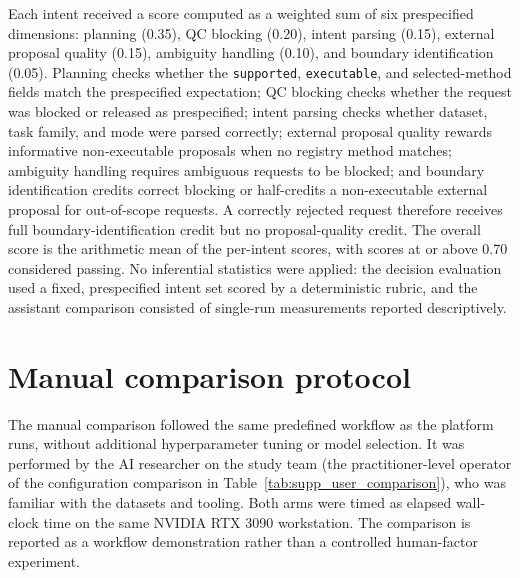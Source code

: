 \documentclass[final,5p,times,twocolumn]{elsarticle}
\begin{document}
Each intent received a score computed as a weighted sum of six prespecified dimensions: planning (0.35), QC blocking (0.20), intent parsing (0.15), external proposal quality (0.15), ambiguity handling (0.10), and boundary identification (0.05). Planning checks whether the \texttt{supported}, \texttt{executable}, and selected-method fields match the prespecified expectation; QC blocking checks whether the request was blocked or released as prespecified; intent parsing checks whether dataset, task family, and mode were parsed correctly; external proposal quality rewards informative non-executable proposals when no registry method matches; ambiguity handling requires ambiguous requests to be blocked; and boundary identification credits correct blocking or half-credits a non-executable external proposal for out-of-scope requests. A correctly rejected request therefore receives full boundary-identification credit but no proposal-quality credit. The overall score is the arithmetic mean of the per-intent scores, with scores at or above 0.70 considered passing. No inferential statistics were applied: the decision evaluation used a fixed, prespecified intent set scored by a deterministic rubric, and the assistant comparison consisted of single-run measurements reported descriptively.

\section{Manual comparison protocol}

The manual comparison followed the same predefined workflow as the platform runs, without additional hyperparameter tuning or model selection. It was performed by the AI researcher on the study team (the practitioner-level operator of the configuration comparison in Table~\ref{tab:supp_user_comparison}), who was familiar with the datasets and tooling. Both arms were timed as elapsed wall-clock time on the same NVIDIA RTX 3090 workstation. The comparison is reported as a workflow demonstration rather than a controlled human-factor experiment.
\end{document}
